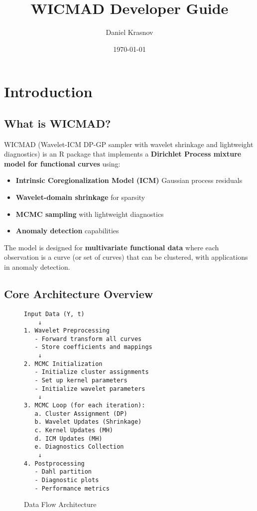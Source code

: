 \documentclass[11pt]{article}
\title{\Huge\textbf{WICMAD Developer Guide}}
\author{Daniel Krasnov}
\date{\today}
\begin{document}
\maketitle

\tableofcontents
\newpage

\section{Introduction}

\subsection{What is WICMAD?}

WICMAD (Wavelet-ICM DP-GP sampler with wavelet shrinkage and lightweight diagnostics) is an R package that implements a \textbf{Dirichlet Process mixture model for functional curves} using:

\begin{itemize}
    \item \textbf{Intrinsic Coregionalization Model (ICM)} Gaussian process residuals
    \item \textbf{Wavelet-domain shrinkage} for sparsity
    \item \textbf{MCMC sampling} with lightweight diagnostics
    \item \textbf{Anomaly detection} capabilities
\end{itemize}

The model is designed for \textbf{multivariate functional data} where each observation is a curve (or set of curves) that can be clustered, with applications in anomaly detection.

\subsection{Core Architecture Overview}

\begin{figure}[h]
\centering
\begin{verbatim}
Input Data (Y, t)
    ↓
1. Wavelet Preprocessing
   - Forward transform all curves
   - Store coefficients and mappings
    ↓
2. MCMC Initialization
   - Initialize cluster assignments
   - Set up kernel parameters
   - Initialize wavelet parameters
    ↓
3. MCMC Loop (for each iteration):
   a. Cluster Assignment (DP)
   b. Wavelet Updates (Shrinkage)
   c. Kernel Updates (MH)
   d. ICM Updates (MH)
   e. Diagnostics Collection
    ↓
4. Postprocessing
   - Dahl partition
   - Diagnostic plots
   - Performance metrics
\end{verbatim}
\caption{Data Flow Architecture}
\end{figure}
\end{document}
